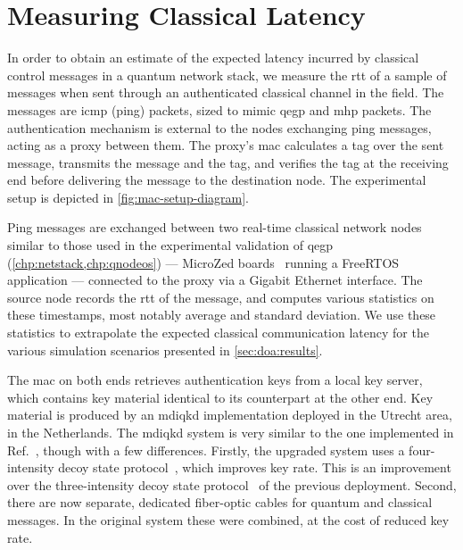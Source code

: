 \section{Measuring Classical Latency}
\label{sec:doa:latency}

In order to obtain an estimate of the expected latency incurred by classical control messages in a
quantum network stack, we measure the \acrfull{rtt} of a sample of messages when sent through an
authenticated classical channel in the field. The messages are \acrshort{icmp} (ping) packets, sized
to mimic \acrshort{qegp} and \acrshort{mhp} packets. The authentication mechanism is external to the
nodes exchanging ping messages, acting as a proxy between them. The proxy's \acrshort{mac}
calculates a tag over the sent message, transmits the message and the tag, and verifies the tag at
the receiving end before delivering the message to the destination node. The experimental setup is
depicted in \cref{fig:mac-setup-diagram}.

Ping messages are exchanged between two real-time classical network nodes similar to those used in
the experimental validation of \acrshort{qegp}~\cite{pompili_2022_experimental}
(\cref{chp:netstack,chp:qnodeos}) --- MicroZed boards~\cite{microzed} running a
FreeRTOS~\cite{freertos} application --- connected to the proxy via a Gigabit Ethernet interface.
The source node records the \acrshort{rtt} of the message, and computes various statistics on these
timestamps, most notably average and standard deviation. We use these statistics to extrapolate the
expected classical communication latency for the various simulation scenarios presented in
\cref{sec:doa:results}.

The \acrfull{mac} on both ends retrieves authentication keys from a local key server, which contains
key material identical to its counterpart at the other end. Key material is produced by an
\acrshort{mdiqkd} implementation deployed in the Utrecht area, in the Netherlands. The
\acrshort{mdiqkd} system is very similar to the one implemented in
Ref.~\cite{berrevoets_2022_deployed}, though with a few differences. Firstly, the upgraded system
uses a four-intensity decoy state protocol~\cite{zhou_2016_making, woodward_2021_gigahertz}, which
improves key rate. This is an improvement over the three-intensity decoy state
protocol~\cite{yu_2013_three} of the previous deployment. Second, there are now separate, dedicated
fiber-optic cables for quantum and classical messages. In the original system these were combined,
at the cost of reduced key rate.

